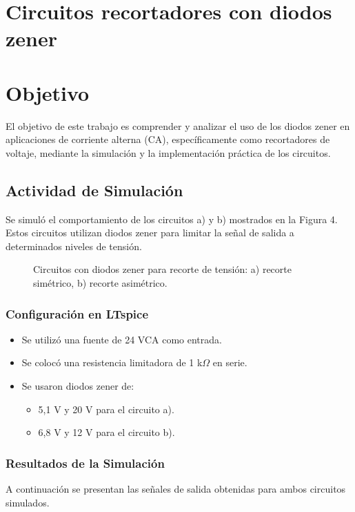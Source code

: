 \section{Circuitos recortadores con diodos zener}

\section*{Objetivo}
El objetivo de este trabajo es comprender y analizar el uso de los diodos zener en aplicaciones de corriente alterna (CA), específicamente como recortadores de voltaje, mediante la simulación y la implementación práctica de los circuitos.


\subsection*{Actividad de Simulación}
Se simuló el comportamiento de los circuitos a) y b) mostrados en la Figura 4. Estos circuitos utilizan diodos zener para limitar la señal de salida a determinados niveles de tensión.

\begin{figure}[H]
    \centering
    \caption{Circuitos con diodos zener para recorte de tensión: a) recorte simétrico, b) recorte asimétrico.}
\end{figure}

\subsubsection*{Configuración en LTspice}
\begin{itemize}
    \item Se utilizó una fuente de 24 VCA como entrada.
    \item Se colocó una resistencia limitadora de 1 k$\Omega$ en serie.
    \item Se usaron diodos zener de:
    \begin{itemize}
        \item 5,1 V y 20 V para el circuito a).
        \item 6,8 V y 12 V para el circuito b).
    \end{itemize}
\end{itemize}

\subsubsection*{Resultados de la Simulación}
A continuación se presentan las señales de salida obtenidas para ambos circuitos simulados.

